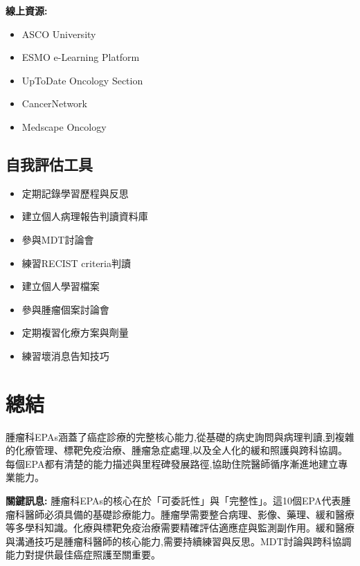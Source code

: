 \documentclass[12pt,a4paper]{article}
\begin{document}
\textbf{線上資源:}
\begin{itemize}
    \item ASCO University
    \item ESMO e-Learning Platform
    \item UpToDate Oncology Section
    \item CancerNetwork
    \item Medscape Oncology
\end{itemize}

\subsection{自我評估工具}
\begin{itemize}[nosep]
    \item 定期記錄學習歷程與反思
    \item 建立個人病理報告判讀資料庫
    \item 參與MDT討論會
    \item 練習RECIST criteria判讀
    \item 建立個人學習檔案
    \item 參與腫瘤個案討論會
    \item 定期複習化療方案與劑量
    \item 練習壞消息告知技巧
\end{itemize}

\section{總結}

腫瘤科EPAs涵蓋了癌症診療的完整核心能力,從基礎的病史詢問與病理判讀,到複雜的化療管理、標靶免疫治療、腫瘤急症處理,以及全人化的緩和照護與跨科協調。每個EPA都有清楚的能力描述與里程碑發展路徑,協助住院醫師循序漸進地建立專業能力。

\begin{importantbox}
\textbf{關鍵訊息:} 腫瘤科EPAs的核心在於「可委託性」與「完整性」。這10個EPA代表腫瘤科醫師必須具備的基礎診療能力。腫瘤學需要整合病理、影像、藥理、緩和醫療等多學科知識。化療與標靶免疫治療需要精確評估適應症與監測副作用。緩和醫療與溝通技巧是腫瘤科醫師的核心能力,需要持續練習與反思。MDT討論與跨科協調能力對提供最佳癌症照護至關重要。
\end{importantbox}

\end{document}
